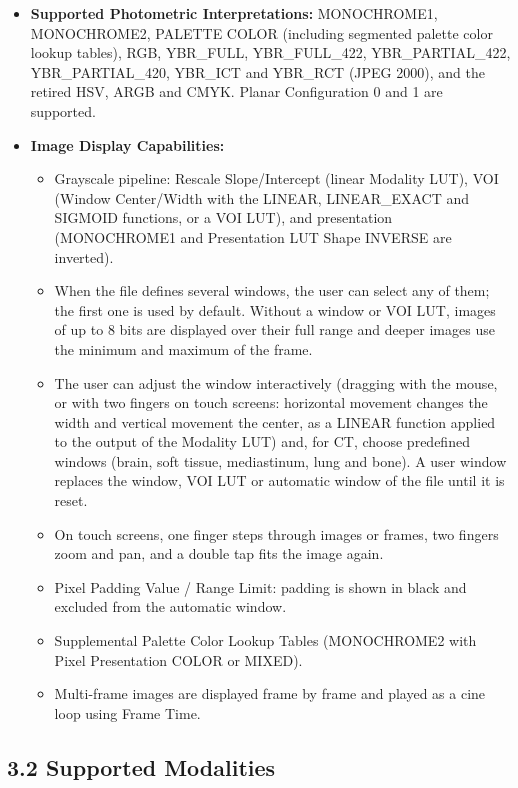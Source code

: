\documentclass[11pt]{article}
\begin{document}
\begin{itemize}
  \item \textbf{Supported Photometric Interpretations:} MONOCHROME1, MONOCHROME2, PALETTE COLOR (including segmented palette color lookup tables), RGB, YBR\_FULL, YBR\_FULL\_422, YBR\_PARTIAL\_422, YBR\_PARTIAL\_420, YBR\_ICT and YBR\_RCT (JPEG 2000), and the retired HSV, ARGB and CMYK. Planar Configuration 0 and 1 are supported.

  \item \textbf{Image Display Capabilities:}
  \begin{itemize}
    \item Grayscale pipeline: Rescale Slope/Intercept (linear Modality LUT), VOI (Window Center/Width with the LINEAR, LINEAR\_EXACT and SIGMOID functions, or a VOI LUT), and presentation (MONOCHROME1 and Presentation LUT Shape INVERSE are inverted).
    \item When the file defines several windows, the user can select any of them; the first one is used by default. Without a window or VOI LUT, images of up to 8 bits are displayed over their full range and deeper images use the minimum and maximum of the frame.
    \item The user can adjust the window interactively (dragging with the mouse, or with two fingers on touch screens: horizontal movement changes the width and vertical movement the center, as a LINEAR function applied to the output of the Modality LUT) and, for CT, choose predefined windows (brain, soft tissue, mediastinum, lung and bone). A user window replaces the window, VOI LUT or automatic window of the file until it is reset.
    \item On touch screens, one finger steps through images or frames, two fingers zoom and pan, and a double tap fits the image again.
    \item Pixel Padding Value / Range Limit: padding is shown in black and excluded from the automatic window.
    \item Supplemental Palette Color Lookup Tables (MONOCHROME2 with Pixel Presentation COLOR or MIXED).
    \item Multi-frame images are displayed frame by frame and played as a cine loop using Frame Time.
  \end{itemize}

\end{itemize}

\subsection*{3.2 Supported Modalities}
\end{document}
